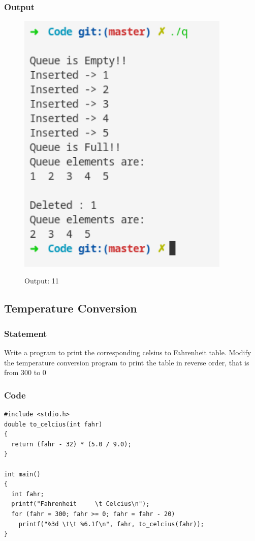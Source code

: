 \subsubsection{Output}
\begin{figure}[!htb]
  \centering
  \includegraphics[width=4in]{Images/q.png}
  \label{output:11}
  \caption{Output: 11}
\end{figure}


\pagebreak
\subsection{Temperature Conversion}
\subsubsection{Statement}
Write a program to print the corresponding celsius to Fahrenheit table. Modify the
temperature conversion program to print the table in reverse order, that is from 300 to 0
\subsubsection{Code}
\begin{verbatim} 
#include <stdio.h>
double to_celcius(int fahr)
{
  return (fahr - 32) * (5.0 / 9.0);
}

int main()
{
  int fahr;
  printf("Fahrenheit     \t Celcius\n");
  for (fahr = 300; fahr >= 0; fahr = fahr - 20)
    printf("%3d \t\t %6.1f\n", fahr, to_celcius(fahr));
}
\end{verbatim}
